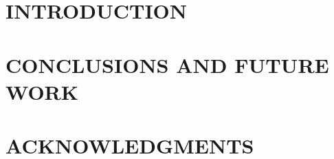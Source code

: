 \documentclass[letterpaper, 10 pt, conference]{ieeeconf}
\title{}
\author{}
\begin{document}
\maketitle
\thispagestyle{empty}
\pagestyle{empty}

\begin{abstract}
\end{abstract}

\section{INTRODUCTION}


\section{}

\subsection{}

\addtolength{\textheight}{-0cm}


\section{CONCLUSIONS AND FUTURE WORK}

\section{ACKNOWLEDGMENTS}


%
\end{document}
